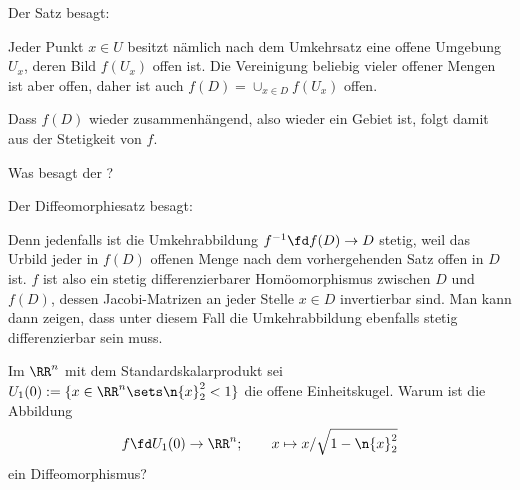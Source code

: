 \begin{antwort}
  Der Satz besagt: 


  \medskip\noindent{}


  \medskip\noindent
  Jeder Punkt $x\in U$ besitzt nämlich nach dem Umkehrsatz eine 
  offene Umgebung $U_x$, deren Bild $f(U_x)$ offen ist. Die Vereinigung beliebig 
  vieler offener Mengen ist aber offen, daher ist auch 
  $f(D) = \cup_{x\in D} f(U_x)$ offen.


  Dass $f(D)$ wieder zusammenhängend, also wieder ein Gebiet ist, folgt damit 
  aus der Stetigkeit von $f$. \AntEnd
\end{antwort}


\begin{frage}
  Was besagt der ?
\end{frage}


\begin{antwort}
  Der Diffeomorphiesatz besagt: 


  \medskip
  \noindent{}


  \medskip\noindent
  Denn jedenfalls ist die Umkehrabbildung $f^{-1} \fd f(D) \to D$ stetig, 
  weil das Urbild jeder in $f(D)$ offenen Menge nach dem vorhergehenden Satz 
  offen in $D$ ist. $f$ ist also ein 
  stetig differenzierbarer Homöomorphismus zwischen $D$ und 
  $f(D)$, dessen Jacobi-Matrizen an jeder Stelle 
  $x\in D$ invertierbar sind. Man kann dann zeigen, dass unter diesem 
  Fall die Umkehrabbildung ebenfalls stetig differenzierbar 
  sein muss. \AntEnd
\end{antwort}

\begin{frage}\label{10_diffs1}
  Im $\RR^n$ mit dem Standardskalarprodukt sei 
  $U_1(0):= \{ x\in \RR^n\sets \n{ x}_2^2 < 1 \}$ die offene 
  Einheitskugel. Warum ist die Abbildung 
  \[
  f \fd U_1 (0) \to \RR^n; \qquad 
  x \mapsto x/ \sqrt{1-\n{x}_2^2 }
  \]
  ein Diffeomorphismus?
\end{frage}


